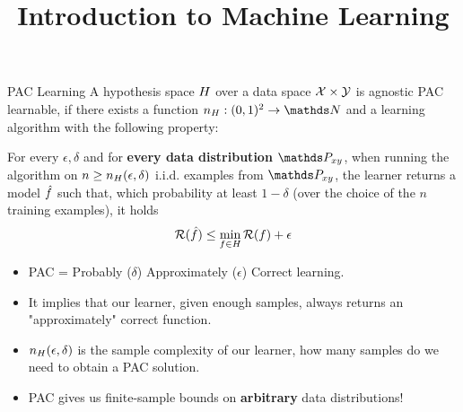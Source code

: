 



\newcommand{\titlefigure}{figure_man/rect_upper_x.png}
\newcommand{\learninggoals}{
  \item Know PAC learning
  \item Know that there is no "universal" learner which works on every task (no free lunch)
  \item Know that complexity of a hypothesis space can be measured by VC dimension
  \item Know that a hypothesis space is PAC learnable iff it has finite VC dimension
}

\title{Introduction to Machine Learning}
\date{}





\begin{vbframe}{PAC Learning}
A hypothesis space $H$ over a data space $\mathcal{X} \times \mathcal{Y}$ is agnostic PAC learnable, if there exists a function $n_\Hspace: (0,1)^2 \rightarrow \N$
and a learning algorithm with the following property: 
  
  For every $\epsilon, \delta$ and for \textbf{every data distribution} $\Pxy$, when running the algorithm on $n \geq n_H(\epsilon, \delta)$ i.i.d. examples from $\Pxy$, the learner returns a model $\hat{f}$ such that, which probability at least $1-\delta$ (over the choice of the $n$ training examples), it holds
$$\mathcal{R}(\hat{f}) \leq \min_{f \in H} \mathcal{R}(f) + \epsilon$$

\begin{itemize}
  \item PAC = Probably ($\delta$) Approximately ($\epsilon$) Correct learning.
  \item It implies that our learner, given enough samples, always returns an "approximately" correct function.
  \item $n_H(\epsilon, \delta)$ is the sample complexity of our learner, how many samples do we need to obtain a PAC solution.
  \item PAC gives us finite-sample bounds on \textbf{arbitrary} data distributions!
\end{itemize}

\end{vbframe}

